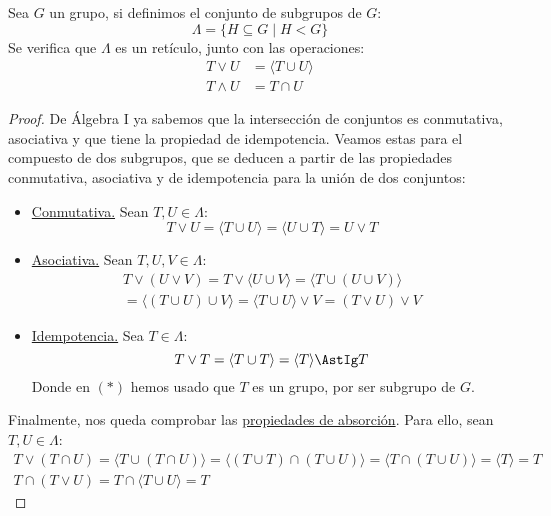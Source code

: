 \begin{prop}
    Sea $G$ un grupo, si definimos el conjunto de subgrupos de $G$:
    \begin{equation*}
        \Lambda = \{H \subseteq G \mid H < G\}
    \end{equation*}
    Se verifica que $\Lambda$ es un retículo, junto con las operaciones:
    \begin{align*}
        T \lor U &= \langle T\cup U \rangle  \\
        T \land U &= T\cap U
    \end{align*}
    \begin{proof}
        De Álgebra I ya sabemos que la intersección de conjuntos es conmutativa, asociativa y que tiene la propiedad de idempotencia. Veamos estas para el compuesto de dos subgrupos, que se deducen a partir de las propiedades conmutativa, asociativa y de idempotencia para la unión de dos conjuntos:
        \begin{itemize}
            \item \underline{Conmutativa.} Sean $T,U\in \Lambda$:
                \begin{equation*}
                    T\lor U = \langle T\cup U \rangle  = \langle U\cup T \rangle  = U\lor T
                \end{equation*}
            \item \underline{Asociativa.} Sean $T,U,V \in \Lambda$:
                \begin{multline*}
                    T\lor (U\lor V) = T\lor \langle U\cup V \rangle  = \langle T\cup (U\cup V) \rangle  \\ = \langle (T\cup U)\cup V \rangle = \langle T\cup U \rangle \lor V = (T\lor U)\lor V
                \end{multline*}
            \item \underline{Idempotencia.} Sea $T\in \Lambda$:
                \begin{equation*}
                    T\lor T = \langle T\cup T \rangle  = \langle T \rangle  \AstIg T
                \end{equation*}
                Donde en $(\ast)$ hemos usado que $T$ es un grupo, por ser subgrupo de $G$.
        \end{itemize}
        Finalmente, nos queda comprobar las \underline{propiedades de absorción}. Para ello, sean $T,U\in \Lambda$:
        \begin{gather*}
            T\lor (T\cap U) = \langle T\cup (T\cap U) \rangle = \langle (T\cup T) \cap (T\cup U) \rangle  = \langle T\cap (T\cup U) \rangle = \langle T \rangle  = T \\
            T\cap (T\lor U) = T\cap \langle T\cup U \rangle = T
        \end{gather*}
    \end{proof}
\end{prop}

